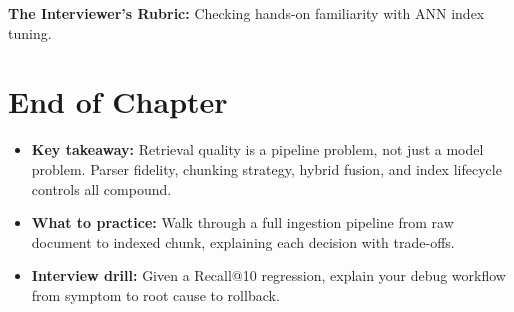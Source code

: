 \textbf{The Interviewer's Rubric:} Checking hands-on familiarity with ANN index tuning.

\section*{End of Chapter}

\begin{itemize}
  \item \textbf{Key takeaway:} Retrieval quality is a pipeline problem, not just a model problem. Parser fidelity, chunking strategy, hybrid fusion, and index lifecycle controls all compound.
  \item \textbf{What to practice:} Walk through a full ingestion pipeline from raw document to indexed chunk, explaining each decision with trade-offs.
  \item \textbf{Interview drill:} Given a Recall@10 regression, explain your debug workflow from symptom to root cause to rollback.
\end{itemize}
